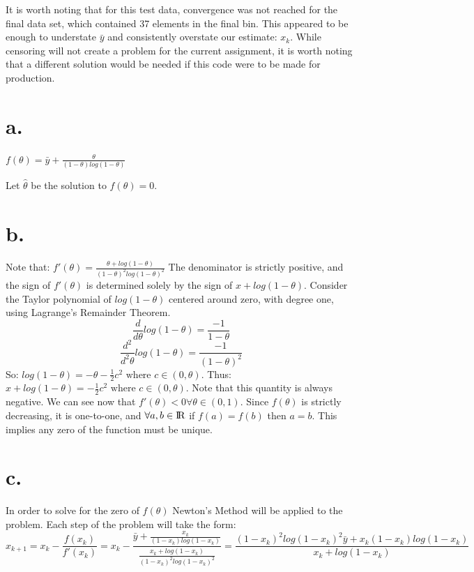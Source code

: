 \documentclass{paper}
\begin{document}
It is worth noting that for this test data, convergence was not reached for the final data set, which contained 37 elements in the final bin. This appeared to be enough to understate $\bar{y}$ and consistently overstate our estimate: $x_k$. While censoring will not create a problem for the current assignment, it is worth noting that a different solution would be needed if this code were to be made for production. 

\section*{a.}

$f( \theta ) = \bar{y} + \frac{ \theta }{( 1 - \theta) log( 1 - \theta )}$

Let $\hat{ \theta }$ be the solution to $f( \theta ) = 0$. 

\section*{b.}
Note that: $f'( \theta ) = \frac{ \theta + log( 1 - \theta ) } { ( 1 - \theta )^2 log( 1 - \theta )^2 }$ The denominator is strictly positive, and the sign of $f'( \theta )$ is determined solely by the sign of $x + log( 1 - \theta )$.
\newline
Consider the Taylor polynomial of $log( 1 - \theta )$ centered around zero, with degree one, using Lagrange's Remainder Theorem. $$\frac{d}{d \theta} log( 1 - \theta ) = \frac{ -1 }{ 1 - \theta }$$
$$\frac{ d^2 }{ d^2 \theta } log( 1 - \theta ) = \frac{ -1 }{ (1 - \theta)^2 }$$
So: $log( 1 - \theta ) = -\theta - \frac{1}{2} c^2 \text{ where } c \in (0, \theta ).$ 
\newline
Thus: $x + log( 1 - \theta ) = - \frac{1}{2} c^2 \text{ where } c \in (0, \theta ).$ Note that this quantity is always negative. We can see now that $f'( \theta ) < 0 \forall \theta \in (0,1).$
Since $f( \theta )$ is strictly decreasing, it is one-to-one, and $\forall a,b \in \rm I\!R$ if $f(a) = f(b)$ then $a = b$. This implies any zero of the function must be unique. 

\section*{c.}
In order to solve for the zero of $f( \theta )$ Newton's Method will be applied to the problem. Each step of the problem will take the form: $$x_{k+1} = x_k - \frac{ f( x_k ) }{ f'( x_k ) } = x_k - \frac{ \bar{y} + \frac{ x_k }{ ( 1 - x_k ) log( 1 - x_k ) }}{ \frac{ x_k + log( 1 - x_k ) }{( 1 - x_k)^2 log( 1 - x_k )^2}} = \frac{ ( 1 - x_k)^2 log( 1 - x_k )^2 \bar{y} + x_k ( 1 - x_k ) log( 1 - x_k ) }{  x_k + log( 1 - x_k ) }$$
\end{document}
